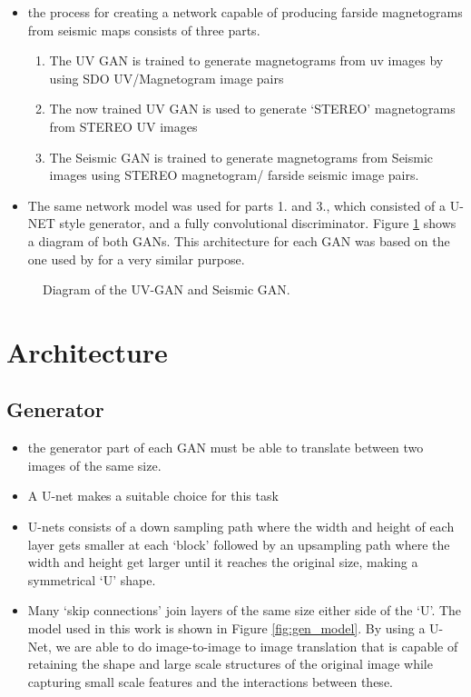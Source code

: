 \documentclass[11pt,a4paper,onecolumn]{report}
\begin{document}
\begin{itemize}
  \item the process for creating a network capable of producing farside
  magnetograms from seismic maps consists of three parts.
  \begin{enumerate}
    \item The UV GAN is trained to generate magnetograms from uv images by using
    SDO UV/Magnetogram image pairs
    \item The now trained UV GAN is used to generate `STEREO' magnetograms from
    STEREO UV images
    \item The Seismic GAN is trained to generate magnetograms from Seismic
    images using STEREO magnetogram/ farside seismic image pairs.
  \end{enumerate}
  
  \item The same network model was used for parts 1. and 3., which consisted of
  a U-NET style generator, and a fully convolutional discriminator. Figure
  \ref{fig:solar_gans_diagram} shows a diagram of both GANs. This architecture
  for each GAN was based on the one used by \citet{Kim2019} for a very similar
  purpose.
\end{itemize}

\begin{figure}[h]
  \centering
  \caption{Diagram of the UV-GAN and Seismic GAN.}
  \label{fig:solar_gans_diagram}
\end{figure}

%
%
%
%
%
\section{Architecture}
%
%
%
%
%
%

\subsection{Generator}





\begin{itemize}
  \item the generator part of each GAN must be able to translate between two
  images of the same size.
  \item A U-net \citep{ronneberger_u-net_2015} makes a suitable choice for this task
  \item U-nets consists of a down sampling path where the width and height of
  each layer gets
  smaller at each `block' followed by an upsampling path where the width and height
  get larger until it reaches the original size, making a symmetrical `U' shape.
  \item   Many `skip connections' join layers of the same size either side of
  the `U'. The model used in this work is shown in Figure \ref{fig:gen_model}.
  By using a U-Net, we are able to do image-to-image to image translation that
  is capable of retaining the shape and large scale structures of the original
  image while capturing small scale features and the interactions between these.
\end{itemize}
  
\end{document}
